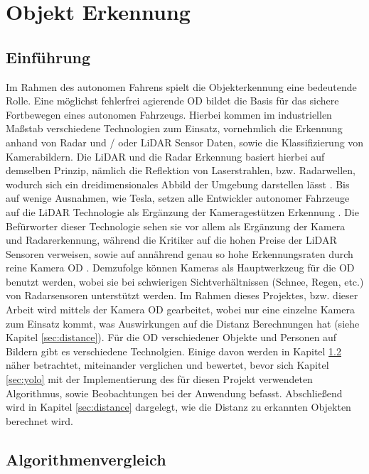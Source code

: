\chapter{Objekt Erkennung}

\section{Einführung}

Im Rahmen des autonomen Fahrens spielt die Objekterkennung eine bedeutende Rolle. Eine möglichst fehlerfrei agierende \ac{OD} bildet die Basis für das sichere Fortbewegen eines autonomen Fahrzeugs.
Hierbei kommen im industriellen Maßstab verschiedene Technologien zum Einsatz, vornehmlich die Erkennung anhand von Radar und / oder \ac{LiDAR} Sensor Daten, sowie die Klassifizierung von Kamerabildern.
Die \ac{LiDAR} und die Radar Erkennung basiert hierbei auf demselben Prinzip, nämlich die Reflektion von Laserstrahlen, bzw. Radarwellen, wodurch sich ein dreidimensionales Abbild der Umgebung darstellen lässt \cite[S.30f.]{Dr.Ing.ThomasTille.2018}.
Bis auf wenige Ausnahmen, wie Tesla, setzen alle Entwickler autonomer Fahrzeuge auf die \ac{LiDAR} Technologie als Ergänzung der Kameragestützen Erkennung \cite{AutoPilotReview.2019}.
Die Befürworter dieser Technologie sehen sie vor allem als Ergänzung der Kamera und Radarerkennung, während die Kritiker auf die hohen Preise der \ac{LiDAR} Sensoren verweisen, sowie auf annährend genau so hohe Erkennungsraten durch reine Kamera \ac{OD} \cite[S.8]{Wang.18.12.2018}.
Demzufolge können Kameras als Hauptwerkzeug für die \ac{OD} benutzt werden, wobei sie bei schwierigen Sichtverhältnissen (Schnee, Regen, etc.) von Radarsensoren unterstützt werden.
Im Rahmen dieses Projektes, bzw. dieser Arbeit wird mittels der Kamera \ac{OD} gearbeitet, wobei nur eine einzelne Kamera zum Einsatz kommt, was Auswirkungen auf die Distanz Berechnungen hat (siehe Kapitel \ref{sec:distance}).
Für die \ac{OD} verschiedener Objekte und Personen auf Bildern gibt es verschiedene Technolgien. Einige davon werden in Kapitel \ref{sec:comp} näher betrachtet, miteinander verglichen und bewertet, bevor sich Kapitel \ref{sec:yolo} mit der Implementierung des für diesen Projekt verwendeten Algorithmus, sowie Beobachtungen bei der Anwendung befasst. Abschließend wird in Kapitel \ref{sec:distance} dargelegt, wie die Distanz zu erkannten Objekten berechnet wird.

\section{Algorithmenvergleich}\label{sec:comp}

